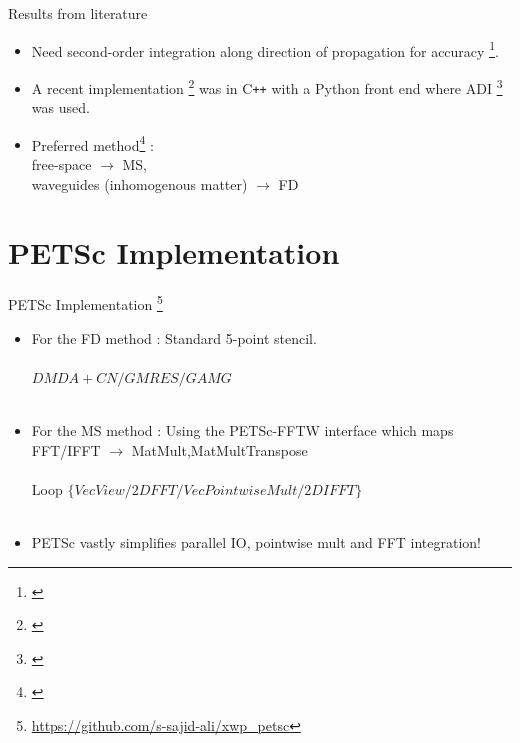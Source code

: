 \documentclass{beamer}
\begin{document}
\begin{frame}{Results from literature}
\begin{itemize}
	\item Need second-order integration along direction of propagation for accuracy \footnote{\cite{Fuhse_thesis,Melchior17}}.
	\item A recent implementation \footnote{\cite{Melchior17}} was in C\texttt{++} with a Python front end where ADI \footnote{\cite{BIRKHOFF1962189}} was used.
	\item Preferred method\footnote{\cite{Melchior17}} : 		
	\\
	free-space $\rightarrow$ MS,
	\\
	waveguides (inhomogenous matter) $\rightarrow$ FD 
\end{itemize}
\end{frame}

\section{PETSc Implementation}
	
\begin{frame}{PETSc Implementation \footnote{\url{https://github.com/s-sajid-ali/xwp_petsc}}}
\begin{itemize}
	\item For the FD method : Standard 5-point stencil.
	\\~\\
	\qquad	${DMDA + CN/GMRES/GAMG}$
	\\~\\
	\item For the MS method : Using the PETSc-FFTW interface which maps FFT/IFFT $\rightarrow$ MatMult,MatMultTranspose
	\\~\\
	\qquad	Loop $\{VecView/2DFFT/VecPointwiseMult/2DIFFT\}$
	\\~\\
	\item PETSc vastly simplifies parallel IO, pointwise mult and FFT integration!	
\end{itemize}
\end{frame}
\end{document}
